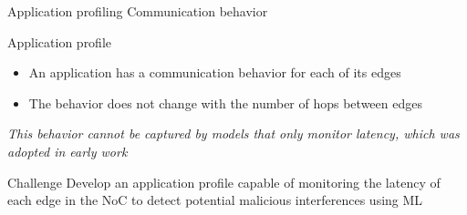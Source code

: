 \begin{frame}{Application profiling}
    \centering Communication behavior

    \begin{figure}[!ht]
        \centering
        \resizebox{0.75\linewidth}{!}{
            
        }
    \end{figure}
\end{frame}

\begin{frame}{Application profile}
    \begin{itemize}
        \item An application has a communication behavior for each of its edges
        \item The behavior does not change with the number of hops between edges
    \end{itemize}

    \vspace{0.5cm}
    \textit{This behavior cannot be captured by models that only monitor latency, which was adopted in early work}

    \begin{alertblock}{Challenge}
        Develop an application profile capable of monitoring the latency of each edge in the NoC to detect potential malicious interferences using ML
    \end{alertblock}
\end{frame}
